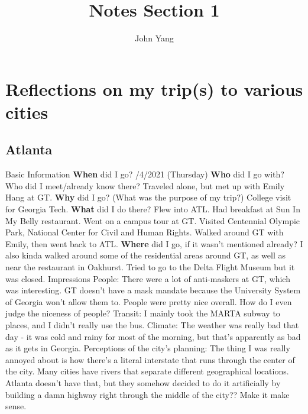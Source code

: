 \documentclass{article}
\title{Notes Section 1} %
\author{John Yang}
\begin{document}
    \maketitle
    \tableofcontents
    \section{Reflections on my trip(s) to various cities}
    \subsection{Atlanta}
    \begin{outline}
        \1 Basic Information
            \2 \textbf{When} did I go?
                /4/2021 (Thursday)
            \2 \textbf{Who} did I go with? Who did I meet/already know there?
                \3 Traveled alone, but met up with Emily Hang at GT. 
            \2 \textbf{Why} did I go? (What was the purpose of my trip?)
                \3 College visit for Georgia Tech. 
            \2 \textbf{What} did I do there?
                \3 Flew into ATL. Had breakfast at Sun In My Belly restaurant. Went on a campus tour at GT. Visited Centennial Olympic Park, National Center for Civil and Human Rights. Walked around GT with Emily, then went back to ATL. 
            \2 \textbf{Where} did I go, if it wasn't mentioned already?
                \3 I also kinda walked around some of the residential areas around GT, as well as near the restaurant in Oakhurst. 
                \3 Tried to go to the Delta Flight Museum but it was closed. 
        \1 Impressions
            \2 People: 
                \3 There were a lot of anti-maskers at GT, which was interesting. GT doesn't have a mask mandate because the University System of Georgia won't allow them to. 
                \3 People were pretty nice overall. How do I even judge the niceness of people?
            \2 Transit:
                \3 I mainly took the MARTA subway to places, and I didn't really use the bus. 
            \2 Climate:
                \3 The weather was really bad that day - it was cold and rainy for most of the morning, but that's apparently as bad as it gets in Georgia. 
            \2 Perceptions of the city's planning:
                \3 The thing I was really annoyed about is how there's a literal interstate that runs through the center of the city. Many cities have rivers that separate different geographical locations. Atlanta doesn't have that, but they somehow decided to do it artificially by building a damn highway right through the middle of the city?? Make it make sense. 


\end{outline}
\end{document}
